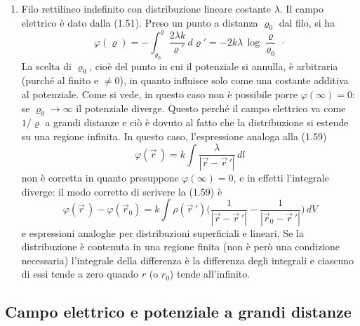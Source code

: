 \begin{enumerate}
    dove la scelta $\varphi=0$ per $z\le0$ \`e arbitraria: la cosa importante
    \`e che la differenza di potenziale fra le due distribuzioni \`e
    $4\pi k\sigma d\equiv Ed$.
  \item Filo rettilineo indefinito con distribuzione lineare costante $\lambda$.
    Il campo elettrico \`e dato dalla (1.51). Preso un punto a distanza
    $\varrho_0$ dal filo, si ha
    \begin{equation}
      \varphi(\varrho)
      =-\int_{\varrho_0}^\varrho\frac{2\lambda k}{\varrho'}\,d\varrho'
      =-2k\lambda\,\log\frac{\varrho}{\varrho_0}\,\cdot
      \tag{1.72}
    \end{equation}
    La scelta di $\varrho_0$, cio\`e del punto in cui il potenziale si annulla,
    \`e arbitraria (purch\'e al finito e $\neq0$), in quanto influisce solo come
    una costante additiva al potenziale. Come si vede, in questo caso non \`e
    possibile porre $\varphi(\infty)=0$: se $\varrho_0\to\infty$ il potenziale
    diverge. Questo perch\'e il campo elettrico va come $1/\varrho$ a grandi
    distanze e ci\`o \`e dovuto al fatto che la distribuzione si estende su una
    regione infinita. In questo caso, l'espressione analoga alla (1.59)
    \[
      \varphi(\vec r\,)=k\int\frac{\lambda}{|\vec r-\vec r\,'|}\,dl
    \]
    non \`e corretta in quanto presuppone $\varphi(\infty)=0$, e in effetti
    l'integrale diverge: il modo corretto di scrivere la (1.59) \`e
    \begin{equation}
      \varphi(\vec r\,)-\varphi(\vec r_0)
      =k\int\rho(\vec r\,')\Big(\frac{1}{|\vec r-\vec r\,'|}
      -\frac{1}{|\vec r_0-\vec r\,'|}\Big)\,dV
      \tag{1.73}
    \end{equation}
    e espressioni analoghe per distribuzioni superficiali e lineari. Se la
    distribuzione \`e contenuta in una regione finita (non \`e per\`o una
    condizione necessaria) l'integrale della differenza \`e la differenza degli
    integrali e ciascuno di essi tende a zero quando $r$ (o $r_0$) tende
    all'infinito.
\end{enumerate}

\subsection{Campo elettrico e potenziale a grandi distanze}

